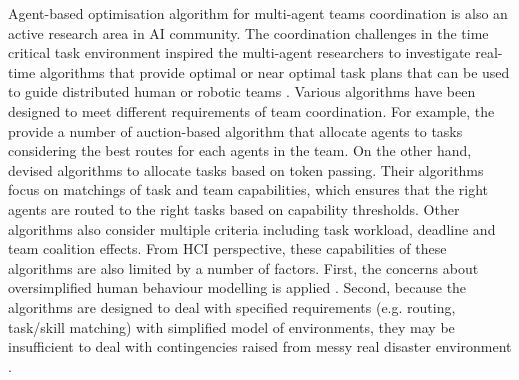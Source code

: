 
Agent-based optimisation algorithm for multi-agent teams coordination is also an active research area in \ac{AI} community. The coordination challenges in the time critical task environment inspired the multi-agent researchers to investigate real-time algorithms that provide optimal or near optimal task plans that can be used to guide distributed human or robotic teams \cite{Kitano2000}. Various algorithms have been designed to meet different requirements of team coordination. For example, the \cite{Lagoudakis2005} provide a number of auction-based algorithm that allocate agents to tasks considering the best routes for each agents in the team. On the other hand, \cite{Scerri2005a} devised algorithms to allocate tasks based on token passing. Their algorithms focus on matchings of task and team capabilities, which ensures that the right agents are routed to the right tasks based on capability thresholds. Other algorithms \cite{Ramchurn2010,Koes2005} also consider multiple criteria including task workload, deadline and team coalition effects. From \ac{HCI} perspective, these capabilities of these algorithms are also limited by a number of factors. First, the concerns about oversimplified human behaviour modelling is applied \cite{Drury2009}. Second, because the algorithms are designed to deal with specified requirements (e.g. routing, task/skill matching) with simplified model of environments, they may be insufficient to deal with contingencies raised from messy real disaster environment \cite{Armenakis2012}.\\

